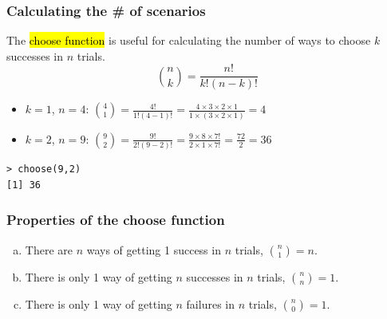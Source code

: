 \documentclass[11pt,containsverbatim,handout]{beamer}
\begin{document}

\begin{frame}[fragile]
\frametitle{Calculating the \# of scenarios}

{
The \hl{choose function} is useful for calculating the number of ways to choose $k$ successes in $n$ trials.
\[ {n \choose k} = \frac{n!}{k! (n - k)!} \]
}

\pause

\begin{itemize}

\item $k = 1$, $n = 4$: ${4 \choose 1} = \frac{4!}{1! (4 - 1)!} = \frac{4 \times 3 \times 2 \times 1}{1 \times (3 \times 2 \times 1)} = 4$

\pause

\item $k = 2$, $n = 9$: ${9 \choose 2} = \frac{9!}{2! (9 - 2)!} = \frac{9 \times 8 \times 7!}{2 \times 1 \times 7!} = \frac{72}{2} = 36$

\end{itemize}

\vfill

\begin{beamerboxesrounded}[shadow = true, lower = code body]{}
{\small
\begin{verbatim}
> choose(9,2)
[1] 36
\end{verbatim}
}
\end{beamerboxesrounded}

\end{frame}


\begin{frame}[fragile]
\frametitle{Properties of the choose function}


\begin{enumerate}[(a)]
\item There are $n$ ways of getting 1 success in $n$ trials, ${n \choose 1} = n$.
\item There is only 1 way of getting $n$ successes in $n$ trials, ${n \choose n} = 1$.
\item There is only 1 way of getting $n$ failures in $n$ trials, ${n \choose 0} = 1$.
\end{enumerate}

\end{frame}
\end{document}
